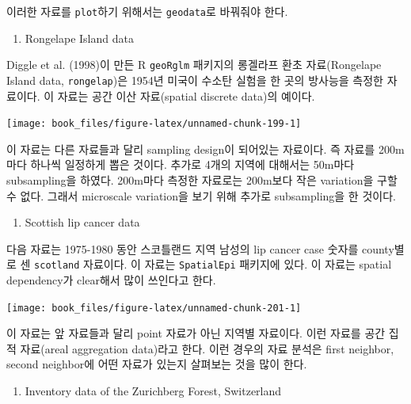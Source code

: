\documentclass[b5paper,]{scrbook}
\providecommand{\tightlist}{%
  \setlength{\itemsep}{0pt}\setlength{\parskip}{0pt}}
\theoremstyle{plain}
\theoremstyle{definition}
\numberwithin{equation}{section}
\begin{document}
이러한 자료를 \texttt{plot}하기 위해서는 \texttt{geodata}로 바꿔줘야
한다.

\begin{enumerate}
\def\labelenumi{\arabic{enumi}.}
\setcounter{enumi}{1}
\tightlist
\item
  Rongelape Island data
\end{enumerate}

Diggle et al. (1998)이 만든 R \texttt{geoRglm} 패키지의 롱겔라프 환초
자료(Rongelape Island data, \texttt{rongelap})은 1954년 미국이 수소탄
실험을 한 곳의 방사능을 측정한 자료이다. 이 자료는 공간 이산
자료(spatial discrete data)의 예이다.

\begin{center}\texttt{[image: book\_files/figure-latex/unnamed-chunk-199-1]} \end{center}

이 자료는 다른 자료들과 달리 sampling design이 되어있는 자료이다. 즉
자료를 200m마다 하나씩 일정하게 뽑은 것이다. 추가로 4개의 지역에
대해서는 50m마다 subsampling을 하였다. 200m마다 측정한 자료로는 200m보다
작은 variation을 구할 수 없다. 그래서 microscale variation을 보기 위해
추가로 subsampling을 한 것이다.

\begin{enumerate}
\def\labelenumi{\arabic{enumi}.}
\setcounter{enumi}{2}
\tightlist
\item
  Scottish lip cancer data
\end{enumerate}

다음 자료는 1975-1980 동안 스코틀랜드 지역 남성의 lip cancer case 숫자를
county별로 센 \texttt{scotland} 자료이다. 이 자료는 \texttt{SpatialEpi}
패키지에 있다. 이 자료는 spatial dependency가 clear해서 많이 쓰인다고
한다.

\begin{center}\texttt{[image: book\_files/figure-latex/unnamed-chunk-201-1]} \end{center}

이 자료는 앞 자료들과 달리 point 자료가 아닌 지역별 자료이다. 이런
자료를 공간 집적 자료(areal aggregation data)라고 한다. 이런 경우의 자료
분석은 first neighbor, second neighbor에 어떤 자료가 있는지 살펴보는
것을 많이 한다.

\begin{enumerate}
\def\labelenumi{\arabic{enumi}.}
\setcounter{enumi}{3}
\tightlist
\item
  Inventory data of the Zurichberg Forest, Switzerland
\end{enumerate}
\end{document}
